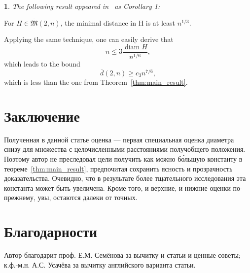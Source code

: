 \documentclass[11pt,twoside,draft
]{article}
\newtheorem{Remark}{\indent {\sc Remark}}
\begin{document}
\begin{Remark}
	The following result appeared in~\cite{solymosi2003note} as Corollary 1:
\end{Remark}

\begin{lemma}
	For $H \in \overline {\mathfrak{M}}(2,n)$, the minimal
	distance in H is at least $n^{1/3}$.
\end{lemma}
Applying the same technique, one can easily derive that
\begin{equation}
	n \leq 3 \frac{\operatorname{diam} H }{n^{1/6}}
	,
\end{equation}
which leads to the bound
\begin{equation}
	\overline{d}(2,n) \geq c_3 n^{7/6}
	,
\end{equation}
which is less than the one from Theorem~\ref{thm:main_result}.


\section{Заключение}
Полученная в данной статье оценка ---
первая специальная оценка диаметра снизу для множества с целочисленными расстояниями получобщего положения.
Поэтому автор не преследовал цели получить как можно б\'ольшую константу в теореме~\ref{thm:main_result},
предпочитая сохранить ясность и прозрачность доказательства.
Очевидно, что в результате более тщательного исследования эта константа может быть увеличена.
Кроме того, и верхние, и нижние оценки по-прежнему, увы, остаются далеки от точных.

\section{Благодарности}
Автор благодарит проф. Е.М. Семёнова за вычитку и статьи и ценные советы;
к.ф.-м.н. А.С. Усачёва за вычитку английского варианта статьи.













\label{end}
\end{document}
